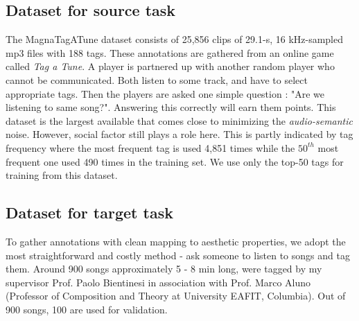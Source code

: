 \subsection{Dataset for source task}
\label{source}
The MagnaTagATune dataset consists of 25,856 clips of 29.1-s, 16 kHz-sampled mp3 files with 188 tags. These annotations are gathered from an online game called \textit{Tag a Tune}. A player is partnered up with another random player who cannot be communicated. Both listen to some track, and have to select appropriate tags. Then the players are asked one simple question : "Are we listening to same song?". Answering this correctly will earn them points. This dataset is the largest available that comes close to minimizing the \textit{audio-semantic} noise. However, social factor still plays a role here. This is partly indicated by tag frequency where the most frequent tag is used 4,851 times while the $50^{th}$ most frequent one used 490 times in the training set. We use only the top-50 tags for training from this dataset.  

\subsection{Dataset for target task}
\label{target}
To gather annotations with clean mapping to aesthetic properties, we adopt the most straightforward and costly method - ask someone to listen to songs and tag them. Around 900 songs approximately 5 - 8 min long, were tagged by my supervisor Prof. Paolo Bientinesi in association with Prof. Marco Aluno (Professor of Composition and Theory at University EAFIT, Columbia). Out of 900 songs, 100 are used for validation.  

